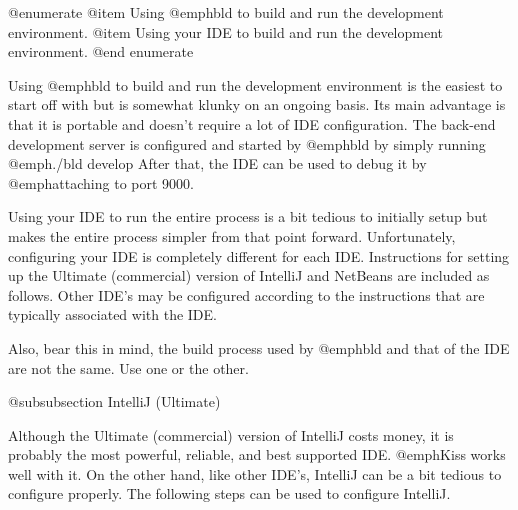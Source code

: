 @enumerate
@item
Using @emph{bld} to build and run the development environment.
@item
Using your IDE to build and run the development environment.
@end enumerate

Using @emph{bld} to build and run the development environment is the
easiest to start off with but is somewhat klunky on an ongoing basis.
Its main advantage is that it is portable and doesn't require a lot of
IDE configuration.  The back-end development server is configured and
started by @emph{bld} by simply running @emph{./bld develop} After
that, the IDE can be used to debug it by @emph{attaching} to port
9000.

Using your IDE to run the entire process is a bit tedious to initially
setup but makes the entire process simpler from that point forward.
Unfortunately, configuring your IDE is completely different for each
IDE.  Instructions for setting up the Ultimate (commercial) version of
IntelliJ and NetBeans are included as follows.  Other IDE's may be
configured according to the instructions that are typically associated
with the IDE.

Also, bear this in mind, the build process used by @emph{bld} and that
of the IDE are not the same.  Use one or the other.


@subsubsection IntelliJ (Ultimate)

Although the Ultimate (commercial) version of IntelliJ costs money, it
is probably the most powerful, reliable, and best supported IDE.
@emph{Kiss} works well with it.  On the other hand, like other IDE's,
IntelliJ can be a bit tedious to configure properly.  The following
steps can be used to configure IntelliJ.

